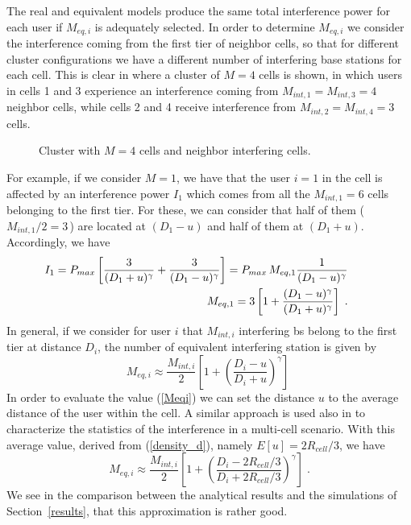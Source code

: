 The real and equivalent models produce the same total interference power for each user if $M_{eq,i}$ is adequately selected. In order to determine $M_{eq,i}$ we consider the interference coming from the first tier of neighbor cells, so that for different cluster configurations we have a different number of interfering base stations for each cell.
This is clear in  where a cluster of $M=4$ cells is shown, in which users in cells 1 and 3 experience an interference coming from $M_{int,1}=M_{int,3}=4$ neighbor cells, while cells 2 and 4 receive interference from $M_{int, 2}=M_{int, 4}=3$ cells.
\begin{figure}[h]
\begin{center}
\begin{small}
\end{small}
\end{center}
\vspace*{1.2mm}\caption{Cluster with $M=4$ cells and neighbor interfering cells.}\label{Meq}
\end{figure}
For example, if we consider $M=1$, we have that the user $i=1$ in the cell is affected by an interference power $I_1$ which comes from all the $M_{int, 1}=6$ cells belonging to the first tier. For these, we can consider that half of them ($M_{int, 1}/2=3\,$) are located at $(D_1-u)$ and half of them at $(D_1+u)$.
Accordingly, we have
\begin{eqnarray}
 &&\hspace*{-12mm}I_1=P_{max}\left[\frac{3}{(D_1+u)^\gamma} + \frac{3}{(D_1-u)^\gamma}\right] = P_{max}\,M_{eq, 1}\frac{1}{(D_1-u)^\gamma}\\
 &&\hspace*{-12mm}M_{eq, 1}=3\left[1+\frac{(D_1-u)^{\gamma}}{(D_1+u)^{\gamma}}\right]\;.
\end{eqnarray}
In general, if we consider for user $i$ that $M_{int, i}$ interfering \gls{bs} belong to the first tier at distance $D_i$, the number of equivalent interfering station is given by 
\begin{equation}
 M_{eq, i} \approx \frac{M_{int, i}}{2} \left[1+\left(\frac{D_i-u}{D_i+u}\right)^\gamma\right]\; \label{Meqi}
\end{equation}
In order to evaluate the value (\ref{Meqi}) we can set the distance $u$ to the average distance of the user within the cell. A similar approach is used also in \cite{pijcke11} to characterize the statistics of the interference in a multi-cell scenario. 
With this average value, derived from (\ref{density_d}), namely $E[u]=2R_{cell}/3$, we have 
\begin{equation}
 M_{eq, i} \approx \frac{M_{int, i}}{2} \left[1+\left(\frac{D_i-2R_{cell}/3}{D_i+2R_{cell}/3}\right)^\gamma\right]\;.\label{exprMeq}
\end{equation}
We see in the comparison between the analytical results and the simulations of Section~\ref{results}, that this approximation is rather good.

